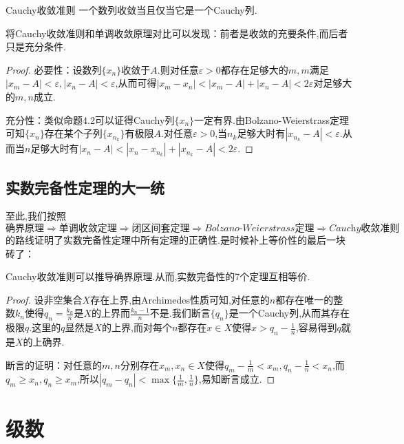 \begin{theorem}{Cauchy收敛准则}
	一个数列收敛当且仅当它是一个Cauchy列.
\end{theorem}
\begin{remark}
	将Cauchy收敛准则和单调收敛原理对比可以发现：前者是收敛的充要条件,而后者只是充分条件.
\end{remark}
\begin{proof}
	必要性：设数列$\{ x_n \}$收敛于$A$.则对任意$\varepsilon >0$都存在足够大的$m,m$满足$|x_m-A|<\varepsilon ,|x_n-A|<\varepsilon$,从而可得$|x_m-x_n|<|x_m-A|+|x_n-A|<2\varepsilon$对足够大的$m,n$成立.
	
	充分性：类似命题4.2可以证得Cauchy列$\{ x_n \}$一定有界.由Bolzano-Weierstrass定理可知$\{ x_n \}$存在某个子列$\{ x_{n_k} \}$有极限$A$.对任意$\varepsilon >0$,当$n_k$足够大时有$|x_{n_k} - A|<\varepsilon$.从而当$n$足够大时有$|x_n-A|<|x_n-x_{n_k}|+|x_{n_k}-A|<2\varepsilon$.
\end{proof}

\subsection{实数完备性定理的大一统}

至此,我们按照$$\textit{确界原理} \Rightarrow \textit{单调收敛定理} \Rightarrow \textit{闭区间套定理} \Rightarrow \textit{Bolzano-Weierstrass定理} \Rightarrow \textit{Cauchy收敛准则}$$的路线证明了实数完备性定理中所有定理的正确性.是时候补上等价性的最后一块砖了：

\begin{proposition}{}
	Cauchy收敛准则可以推导确界原理.从而,实数完备性的7个定理互相等价.
\end{proposition}
\begin{proof}
	设非空集合$X$存在上界,由Archimedes性质可知,对任意的$n$都存在唯一的整数$k_n$使得$q_n=\frac{k_n}{n}$是$X$的上界而$\frac{k_n-1}{n}$不是.我们断言$\{ q_n \}$是一个Cauchy列,从而其存在极限$q$.这里的$q$显然是$X$的上界,而对每个$n$都存在$x \in X$使得$x>q_n-\frac{1}{n}$,容易得到$q$就是$X$的上确界.
	
	断言的证明：对任意的$m,n$分别存在$x_m,x_n \in X$使得$q_m-\frac{1}{m} < x_m,q_n-\frac{1}{n} < x_n$,而$q_m \geq x_n,q_n \geq x_m$,所以$|q_m-q_n|<\max \{ \frac{1}{m},\frac{1}{n} \}$,易知断言成立.
\end{proof}

\section{级数}

